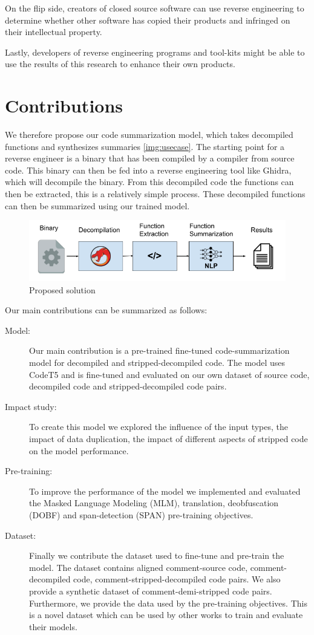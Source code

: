 On the flip side, creators of closed source software can use reverse engineering to determine whether other software has copied their products and infringed on their intellectual property.

Lastly, developers of reverse engineering programs and tool-kits might be able to use the results of this research to enhance their own products. 

\section{Contributions}
We therefore propose our code summarization model, which takes decompiled functions and synthesizes summaries \ref{img:usecase}. The starting point for a reverse engineer is a binary that has been compiled by a compiler from source code. This binary can then be fed into a reverse engineering tool like Ghidra, which will decompile the binary. From this decompiled code the functions can then be extracted, this is a relatively simple process. These decompiled functions can then be summarized using our trained model.

\begin{figure}[htb]
    \centering
    \includegraphics[width=\textwidth,height=\textheight,keepaspectratio]{img/UseCase.png}
    \caption{Proposed solution}
    \label{img:useCase}
\end{figure}

Our main contributions can be summarized as follows:
\begin{description}
 \item[Model:] Our main contribution is a pre-trained fine-tuned code-summarization model for decompiled and stripped-decompiled code. The model uses CodeT5 and is fine-tuned and evaluated on our own dataset of source code, decompiled code and stripped-decompiled code pairs. 
 \item[Impact study:] To create this model we explored the influence of the input types, the impact of data duplication, the impact of different aspects of stripped code on the model performance.
 \item[Pre-training:] To improve the performance of the model we implemented and evaluated the Masked Language Modeling (MLM), translation, deobfuscation (DOBF) and span-detection (SPAN) pre-training objectives. 
 \item[Dataset:] Finally we contribute the dataset used to fine-tune and pre-train the model. The dataset contains aligned comment-source code, comment-decompiled code, comment-stripped-decompiled code pairs. We also provide a synthetic dataset of comment-demi-stripped code pairs. Furthermore, we provide the data used by the pre-training objectives. This is a novel dataset which can be used by other works to train and evaluate their models.
\end{description}

